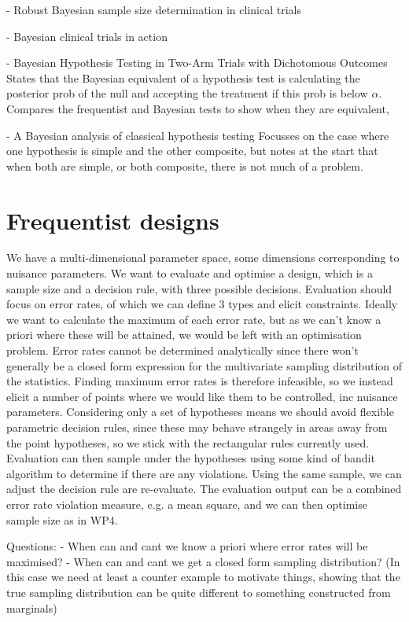 \documentclass{article} %
\begin{document}
\cite{Brutti2008} - Robust Bayesian sample size determination in clinical trials

\cite{JackLee2012} - Bayesian clinical trials in action

\cite{Zaslavsky2013} - Bayesian Hypothesis Testing in Two-Arm Trials with Dichotomous Outcomes
States that the Bayesian equivalent of a hypothesis test is calculating the posterior prob of the null and accepting the treatment if this prob is below $\alpha$. Compares the frequentist and Bayesian tests to show when they are equivalent, 

\cite{Bernardo1980} - A Bayesian analysis of classical hypothesis testing
Focusses on the case where one hypothesis is simple and the other composite, but notes at the start that when both are simple, or both composite, there is not much of a problem.


\section{Frequentist designs}

We have a multi-dimensional parameter space, some dimensions corresponding to nuisance parameters.
We want to evaluate and optimise a design, which is a sample size and a decision rule, with three possible decisions.
Evaluation should focus on error rates, of which we can define 3 types and elicit constraints.
Ideally we want to calculate the maximum of each error rate, but as we can't know a priori where these will be attained, we would be left with an optimisation problem.
Error rates cannot be determined analytically since there won't generally be a closed form expression for the multivariate sampling distribution of the statistics.
Finding maximum error rates is therefore infeasible, so we instead elicit a number of points where we would like them to be controlled, inc nuisance parameters.
Considering only a set of hypotheses means we should avoid flexible parametric decision rules, since these may behave strangely in areas away from the point hypotheses, so we stick with the rectangular rules currently used.
Evaluation can then sample under the hypotheses using some kind of bandit algorithm to determine if there are any violations. 
Using the same sample, we can adjust the decision rule are re-evaluate.
The evaluation output can be a combined error rate violation measure, e.g. a mean square, and we can then optimise sample size as in WP4.

Questions:
- When can and cant we know a priori where error rates will be maximised?
- When can and cant we get a closed form sampling distribution? (In this case we need at least a counter example to motivate things, showing that the true sampling distribution can be quite different to something constructed from marginals)
\end{document}
